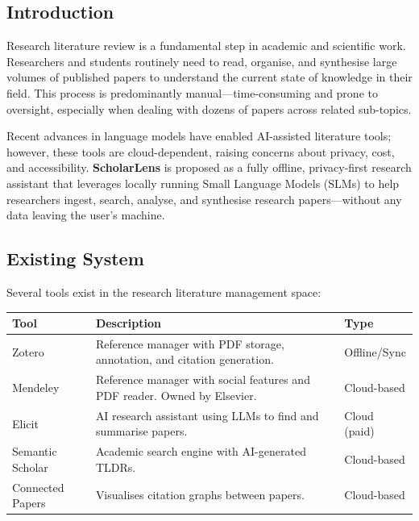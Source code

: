 \documentclass[12pt,a4paper]{article}
\begin{document}
\subsection{Introduction}
Research literature review is a fundamental step in academic and scientific
work.  Researchers and students routinely need to read, organise, and
synthesise large volumes of published papers to understand the current
state of knowledge in their field.  This process is predominantly
manual---time-consuming and prone to oversight, especially when dealing
with dozens of papers across related sub-topics.

Recent advances in language models have enabled AI-assisted literature
tools; however, these tools are cloud-dependent, raising concerns about
privacy, cost, and accessibility.  \textbf{ScholarLens} is proposed as a
fully offline, privacy-first research assistant that leverages locally
running Small Language Models (SLMs) to help researchers ingest, search,
analyse, and synthesise research papers---without any data leaving the
user's machine.

\subsection{Existing System}
Several tools exist in the research literature management space:

\begin{center}
\begin{tabularx}{\textwidth}{|l|X|l|}
    \hline
    \textbf{Tool} & \textbf{Description} & \textbf{Type} \\ \hline
    Zotero & Reference manager with PDF storage, annotation, and
              citation generation. & Offline/Sync \\ \hline
    Mendeley & Reference manager with social features and PDF
               reader. Owned by Elsevier. & Cloud-based \\ \hline
    Elicit & AI research assistant using LLMs to find and
             summarise papers. & Cloud (paid) \\ \hline
    Semantic Scholar & Academic search engine with AI-generated
                       TLDRs. & Cloud-based \\ \hline
    Connected Papers & Visualises citation graphs between papers. & Cloud-based \\ \hline
\end{tabularx}
\end{center}
\end{document}
